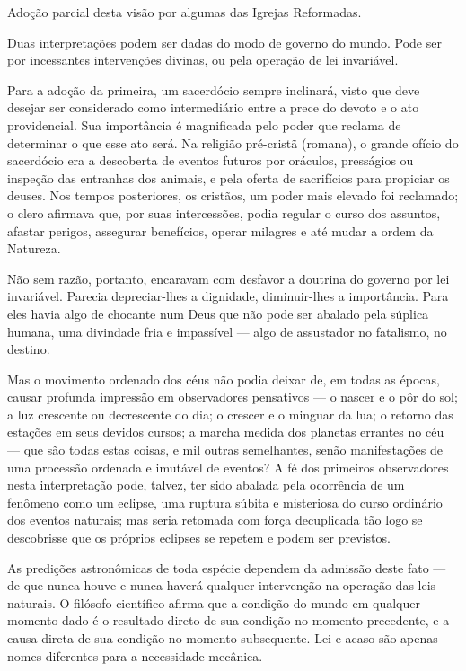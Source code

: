 \documentclass[11pt,a5paper,twoside,openany]{book}
\begin{document}
Adoção parcial desta visão por algumas das Igrejas Reformadas.

Duas interpretações podem ser dadas do modo de governo do mundo. Pode ser por incessantes intervenções divinas, ou pela operação de lei invariável.

Para a adoção da primeira, um sacerdócio sempre inclinará, visto que deve desejar ser considerado como intermediário entre a prece do devoto e o ato providencial. Sua importância é magnificada pelo poder que reclama de determinar o que esse ato será. Na religião pré-cristã (romana), o grande ofício do sacerdócio era a descoberta de eventos futuros por oráculos, presságios ou inspeção das entranhas dos animais, e pela oferta de sacrifícios para propiciar os deuses. Nos tempos posteriores, os cristãos, um poder mais elevado foi reclamado; o clero afirmava que, por suas intercessões, podia regular o curso dos assuntos, afastar perigos, assegurar benefícios, operar milagres e até mudar a ordem da Natureza.

Não sem razão, portanto, encaravam com desfavor a doutrina do governo por lei invariável. Parecia depreciar-lhes a dignidade, diminuir-lhes a importância. Para eles havia algo de chocante num Deus que não pode ser abalado pela súplica humana, uma divindade fria e impassível — algo de assustador no fatalismo, no destino.

Mas o movimento ordenado dos céus não podia deixar de, em todas as épocas, causar profunda impressão em observadores pensativos — o nascer e o pôr do sol; a luz crescente ou decrescente do dia; o crescer e o minguar da lua; o retorno das estações em seus devidos cursos; a marcha medida dos planetas errantes no céu — que são todas estas coisas, e mil outras semelhantes, senão manifestações de uma processão ordenada e imutável de eventos? A fé dos primeiros observadores nesta interpretação pode, talvez, ter sido abalada pela ocorrência de um fenômeno como um eclipse, uma ruptura súbita e misteriosa do curso ordinário dos eventos naturais; mas seria retomada com força decuplicada tão logo se descobrisse que os próprios eclipses se repetem e podem ser previstos.

As predições astronômicas de toda espécie dependem da admissão deste fato — de que nunca houve e nunca haverá qualquer intervenção na operação das leis naturais. O filósofo científico afirma que a condição do mundo em qualquer momento dado é o resultado direto de sua condição no momento precedente, e a causa direta de sua condição no momento subsequente. Lei e acaso são apenas nomes diferentes para a necessidade mecânica.
\end{document}
